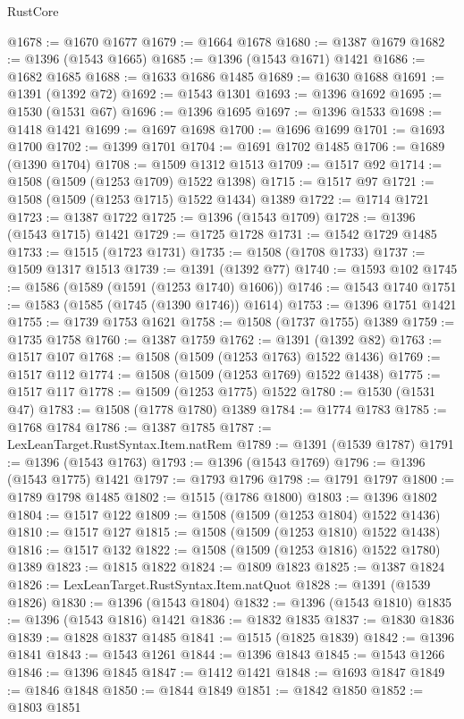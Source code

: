 \begin{lexlean}{RustCore}
\begin{coremodule}
@1678 := @1670 @1677
@1679 := @1664 @1678
@1680 := @1387 @1679
@1682 := @1396 (@1543 @1665)
@1685 := @1396 (@1543 @1671) @1421
@1686 := @1682 @1685
@1688 := @1633 @1686 @1485
@1689 := @1630 @1688
@1691 := @1391 (@1392 @72)
@1692 := @1543 @1301
@1693 := @1396 @1692
@1695 := @1530 (@1531 @67)
@1696 := @1396 @1695
@1697 := @1396 @1533
@1698 := @1418 @1421
@1699 := @1697 @1698
@1700 := @1696 @1699
@1701 := @1693 @1700
@1702 := @1399 @1701
@1704 := @1691 @1702 @1485
@1706 := @1689 (@1390 @1704)
@1708 := @1509 @1312 @1513
@1709 := @1517 @92
@1714 := @1508 (@1509 (@1253 @1709) @1522 @1398)
@1715 := @1517 @97
@1721 := @1508 (@1509 (@1253 @1715) @1522 @1434) @1389
@1722 := @1714 @1721
@1723 := @1387 @1722
@1725 := @1396 (@1543 @1709)
@1728 := @1396 (@1543 @1715) @1421
@1729 := @1725 @1728
@1731 := @1542 @1729 @1485
@1733 := @1515 (@1723 @1731)
@1735 := @1508 (@1708 @1733)
@1737 := @1509 @1317 @1513
@1739 := @1391 (@1392 @77)
@1740 := @1593 @102
@1745 := @1586 (@1589 (@1591 (@1253 @1740) @1606))
@1746 := @1543 @1740
@1751 := @1583 (@1585 (@1745 (@1390 @1746)) @1614)
@1753 := @1396 @1751 @1421
@1755 := @1739 @1753 @1621
@1758 := @1508 (@1737 @1755) @1389
@1759 := @1735 @1758
@1760 := @1387 @1759
@1762 := @1391 (@1392 @82)
@1763 := @1517 @107
@1768 := @1508 (@1509 (@1253 @1763) @1522 @1436)
@1769 := @1517 @112
@1774 := @1508 (@1509 (@1253 @1769) @1522 @1438)
@1775 := @1517 @117
@1778 := @1509 (@1253 @1775) @1522
@1780 := @1530 (@1531 @47)
@1783 := @1508 (@1778 @1780) @1389
@1784 := @1774 @1783
@1785 := @1768 @1784
@1786 := @1387 @1785
@1787 := LexLeanTarget.RustSyntax.Item.natRem
@1789 := @1391 (@1539 @1787)
@1791 := @1396 (@1543 @1763)
@1793 := @1396 (@1543 @1769)
@1796 := @1396 (@1543 @1775) @1421
@1797 := @1793 @1796
@1798 := @1791 @1797
@1800 := @1789 @1798 @1485
@1802 := @1515 (@1786 @1800)
@1803 := @1396 @1802
@1804 := @1517 @122
@1809 := @1508 (@1509 (@1253 @1804) @1522 @1436)
@1810 := @1517 @127
@1815 := @1508 (@1509 (@1253 @1810) @1522 @1438)
@1816 := @1517 @132
@1822 := @1508 (@1509 (@1253 @1816) @1522 @1780) @1389
@1823 := @1815 @1822
@1824 := @1809 @1823
@1825 := @1387 @1824
@1826 := LexLeanTarget.RustSyntax.Item.natQuot
@1828 := @1391 (@1539 @1826)
@1830 := @1396 (@1543 @1804)
@1832 := @1396 (@1543 @1810)
@1835 := @1396 (@1543 @1816) @1421
@1836 := @1832 @1835
@1837 := @1830 @1836
@1839 := @1828 @1837 @1485
@1841 := @1515 (@1825 @1839)
@1842 := @1396 @1841
@1843 := @1543 @1261
@1844 := @1396 @1843
@1845 := @1543 @1266
@1846 := @1396 @1845
@1847 := @1412 @1421
@1848 := @1693 @1847
@1849 := @1846 @1848
@1850 := @1844 @1849
@1851 := @1842 @1850
@1852 := @1803 @1851

\end{coremodule}
\end{lexlean}
